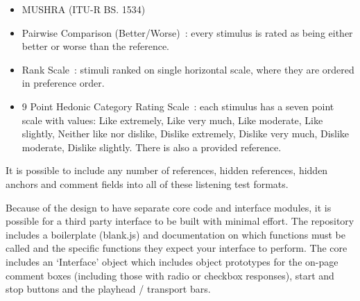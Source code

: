 \documentclass{sig-alternate}
\begin{document}
\begin{itemize}[noitemsep,nolistsep]
		\item MUSHRA (ITU-R BS. 1534)~\cite{recommendation20031534} 

		\item Pairwise Comparison (Better/Worse)~\cite{david1963method}: every stimulus is rated as being either better or worse than the reference.
		\item Rank Scale~\cite{pascoe1983evaluation}: stimuli ranked on single horizontal scale, where they are ordered in preference order.
		\item 9 Point Hedonic Category Rating Scale~\cite{peryam1952advanced}: each stimulus has a seven point scale with values: Like extremely, Like very much, Like moderate, Like slightly, Neither like nor dislike, Dislike extremely, Dislike very much, Dislike moderate, Dislike slightly. There is also a provided reference.
	\end{itemize}
	
	It is possible to include any number of references, hidden references, hidden anchors and comment fields into all of these listening test formats.
	
	Because of the design to have separate core code and interface modules, it is possible for a third party interface to be built with minimal effort. The repository includes a boilerplate (blank.js) and documentation on which functions must be called and the specific functions they expect your interface to perform. The core includes an `Interface' object which includes object prototypes for the on-page comment boxes (including those with radio or checkbox responses), start and stop buttons and the playhead / transport bars.
	
\end{document}
